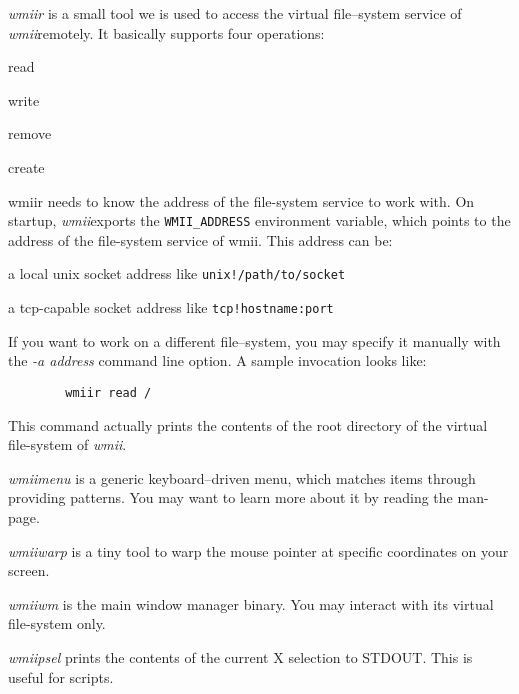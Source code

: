 \documentclass[12pt,a4paper]{article} %
\newcommand{\wmii}{\emph{wmii}}
\newenvironment{itemize*}
  {\begin{itemize}
      \setlength{\itemsep}{0pt}
      \setlength{\parskip}{0pt}}
  {\end{itemize}}
\begin{document}
    \begin{description}
      
    \item
      \emph{wmiir} is a small tool we is used to access the
      virtual file--system service of \wmii remotely. It basically supports four
      operations:

      \begin{itemize*}
      \item read
      \item write
      \item remove
      \item create
      \end{itemize*}

      wmiir needs to know the address of the file-system service to work
      with. On startup, \wmii exports the \verb+WMII_ADDRESS+ environment variable,
      which points to the address of the file-system service of wmii.
      This address can be:
      \begin{itemize*}
      \item a local unix socket address like \verb+unix!/path/to/socket+ 
      \item a tcp-capable socket address like \verb+tcp!hostname:port+ 
      \end{itemize*}
      
      If you want to work on a different file--system, you may specify it
      manually with the \emph{-a  address} command line option.
      A sample invocation looks like:
      \begin{verbatim}
        wmiir read /
      \end{verbatim}
      This command actually prints the contents of the root directory of the
      virtual file-system of \wmii.

    \item
      \emph{wmiimenu} is a generic keyboard--driven menu, which matches items
      through providing patterns.  You may want to learn more about it by reading
      the man-page.

    \item
      \emph{wmiiwarp} is a tiny tool to warp the mouse pointer at specific
      coordinates on your screen.

    \item
      \emph{wmiiwm} is the main window manager binary. You may interact
      with its virtual file-system only.

    \item
      \emph{wmiipsel} prints the contents of the current X selection to
      STDOUT. This is useful for scripts.

    \end{description}
\end{document}
